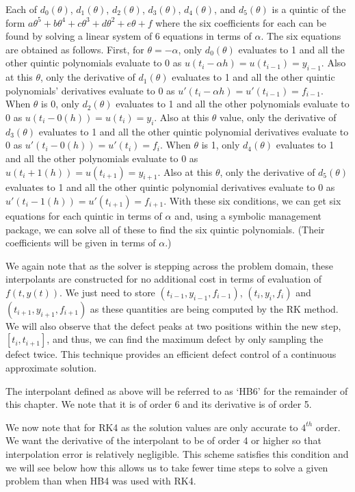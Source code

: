 Each of $d_0(\theta)$, $d_1(\theta)$, $d_2(\theta)$, $d_3(\theta)$, $d_4(\theta)$, and $d_5(\theta)$ is a quintic of the form $a\theta^5 + b\theta^4 + c\theta^3 + d\theta^2 + e\theta + f$ where the six coefficients for each can be found by solving a linear system of 6 equations in terms of $\alpha$. The six equations are obtained as follows. First, for $\theta = -\alpha$, only $d_0(\theta)$ evaluates to 1 and all the other quintic polynomials evaluate to 0 as $u(t_i - \alpha h) = u(t_{i - 1}) = y_{i - 1}$. Also at this $\theta$, only the derivative of $d_1(\theta)$ evaluates to 1 and all the other quintic polynomials' derivatives evaluate to 0 as $u'(t_i - \alpha h) = u'(t_{i - 1}) = f_{i - 1}$. When $\theta$ is 0, only $d_2(\theta)$ evaluates to 1 and all the other polynomials evaluate to 0 as $u(t_i - 0(h)) = u(t_i) = y_i$. Also at this $\theta$ value, only the derivative of $d_3(\theta)$ evaluates to 1 and all the other quintic polynomial derivatives evaluate to 0 as $u'(t_i - 0(h)) = u'(t_i) = f_i$. When $\theta$ is 1, only $d_4(\theta)$ evaluates to 1 and all the other polynomials evaluate to 0 as $u(t_i + 1(h)) = u(t_{i+1}) = y_{i+1}$. Also at this $\theta$, only the derivative of $d_5(\theta)$ evaluates to 1 and all the other quintic polynomial derivatives evaluate to 0 as $u'(t_i - 1(h)) = u'(t_{i+1}) = f_{i+1}$. With these six conditions, we can get six equations for each quintic in terms of $\alpha$ and, using a symbolic management package, we can solve all of these to find the six quintic polynomials. (Their coefficients will be given in terms of $\alpha$.)

We again note that as the solver is stepping across the problem domain, these interpolants are constructed for no additional cost in terms of evaluation of $f(t, y(t))$. We just need to store $(t_{i-1}, y_{i - 1}, f_{i - 1})$, $(t_i, y_i, f_i)$ and $(t_{i + 1}, y_{i + 1}, f_{i + 1})$ as these quantities are being computed by the RK method. We will also observe that the defect peaks at two positions within the new step, $[t_i, t_{i+1}]$, and thus, we can find the maximum defect by only sampling the defect twice. This technique provides an efficient defect control of a continuous approximate solution.

The interpolant defined as above will be referred to as `HB6' for the remainder of this chapter. We note that it is of order 6 and its derivative is of order 5.

We now note that for RK4 as the solution values are only accurate to $4^{th}$ order. We want the derivative of the interpolant to be of order 4 or higher so that interpolation error is relatively negligible. This scheme satisfies this condition and we will see below how this allows us to take fewer time steps to solve a given problem than when HB4 was used with RK4.

